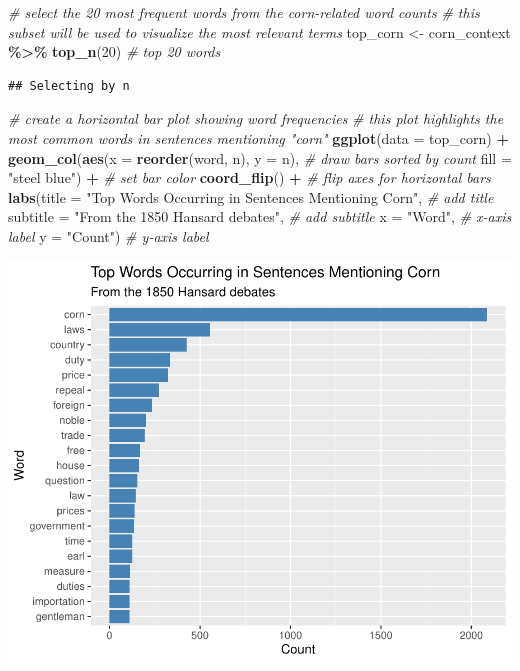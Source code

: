 \documentclass[
]{article}
\newenvironment{Shaded}{\begin{snugshade}}{\end{snugshade}}
\newcommand{\AttributeTok}[1]{\textcolor[rgb]{0.13,0.29,0.53}{#1}}
\newcommand{\CommentTok}[1]{\textcolor[rgb]{0.56,0.35,0.01}{\textit{#1}}}
\newcommand{\DecValTok}[1]{\textcolor[rgb]{0.00,0.00,0.81}{#1}}
\newcommand{\FunctionTok}[1]{\textcolor[rgb]{0.13,0.29,0.53}{\textbf{#1}}}
\newcommand{\NormalTok}[1]{#1}
\newcommand{\OtherTok}[1]{\textcolor[rgb]{0.56,0.35,0.01}{#1}}
\newcommand{\SpecialCharTok}[1]{\textcolor[rgb]{0.81,0.36,0.00}{\textbf{#1}}}
\newcommand{\StringTok}[1]{\textcolor[rgb]{0.31,0.60,0.02}{#1}}
\begin{document}
\begin{Shaded}
\begin{Highlighting}[]
\CommentTok{\# select the 20 most frequent words from the corn{-}related word counts}
\CommentTok{\# this subset will be used to visualize the most relevant terms}
\NormalTok{top\_corn }\OtherTok{\textless{}{-}}\NormalTok{ corn\_context }\SpecialCharTok{\%\textgreater{}\%}
  \FunctionTok{top\_n}\NormalTok{(}\DecValTok{20}\NormalTok{)  }\CommentTok{\# top 20 words}
\end{Highlighting}
\end{Shaded}

\begin{verbatim}
## Selecting by n
\end{verbatim}

\begin{Shaded}
\begin{Highlighting}[]
\CommentTok{\# create a horizontal bar plot showing word frequencies}
\CommentTok{\# this plot highlights the most common words in sentences mentioning "corn"}
\FunctionTok{ggplot}\NormalTok{(}\AttributeTok{data =}\NormalTok{ top\_corn) }\SpecialCharTok{+}
  \FunctionTok{geom\_col}\NormalTok{(}\FunctionTok{aes}\NormalTok{(}\AttributeTok{x =} \FunctionTok{reorder}\NormalTok{(word, n), }\AttributeTok{y =}\NormalTok{ n), }\CommentTok{\# draw bars sorted by count}
           \AttributeTok{fill =} \StringTok{"steel blue"}\NormalTok{) }\SpecialCharTok{+} \CommentTok{\# set bar color}
  \FunctionTok{coord\_flip}\NormalTok{() }\SpecialCharTok{+} \CommentTok{\# flip axes for horizontal bars}
  \FunctionTok{labs}\NormalTok{(}\AttributeTok{title =} \StringTok{"Top Words Occurring in Sentences Mentioning Corn"}\NormalTok{, }\CommentTok{\# add title}
       \AttributeTok{subtitle =} \StringTok{"From the 1850 Hansard debates"}\NormalTok{, }\CommentTok{\# add subtitle}
       \AttributeTok{x =} \StringTok{"Word"}\NormalTok{, }\CommentTok{\# x{-}axis label}
       \AttributeTok{y =} \StringTok{"Count"}\NormalTok{) }\CommentTok{\# y{-}axis label}
\end{Highlighting}
\end{Shaded}

\includegraphics[width=0.8\linewidth]{ch1-11.25.2024_files/figure-latex/unnamed-chunk-32-1}
\end{document}
